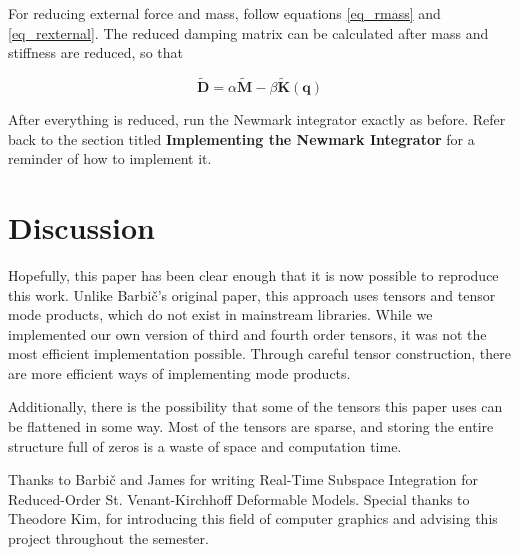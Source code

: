 \documentclass[twocolumn,10pt]{asme2ej}
\begin{document}
For reducing external force and mass, follow equations \ref{eq_rmass} and \ref{eq_rexternal}. The reduced damping matrix can be calculated after mass and stiffness are reduced, so that

\begin{equation}
  \bm{\tilde{D}} = \alpha\bm{\tilde{M}} - \beta\bm{\tilde{K}}(\bm{q})
\end{equation}

After everything is reduced, run the Newmark integrator exactly as before. Refer back to the section titled \textbf{Implementing the Newmark Integrator} for a reminder of how to implement it.

\section{Discussion}

Hopefully, this paper has been clear enough that it is now possible to reproduce this work. Unlike Barbič's original paper, this approach uses tensors and tensor mode products, which do not exist in mainstream libraries. While we implemented our own version of third and fourth order tensors, it was not the most efficient implementation possible. Through careful tensor construction, there are more efficient ways of implementing mode products.

Additionally, there is the possibility that some of the tensors this paper uses can be flattened in some way. Most of the tensors are sparse, and storing the entire structure full of zeros is a waste of space and computation time.

\begin{acknowledgment}

Thanks to Barbič and James for writing Real-Time Subspace Integration for Reduced-Order St. Venant-Kirchhoff Deformable Models. Special thanks to Theodore Kim, for introducing this field of computer graphics and advising this project throughout the semester.

\end{acknowledgment}



\end{document}
